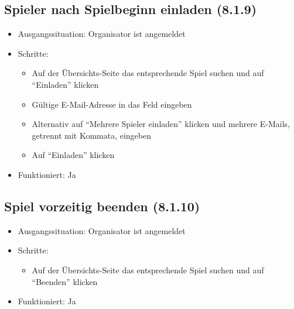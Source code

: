 \documentclass[a4paper]{scrreprt}
\begin{document}
            \subsection{Spieler nach Spielbeginn einladen (8.1.9)}
            \begin{itemize}
                \item Ausgangssituation: Organisator ist angemeldet
                \item Schritte:
                    \begin{itemize}
                        \item Auf der Übersichts-Seite das entsprechende Spiel suchen und auf \enquote{Einladen} klicken
                        \item Gültige E-Mail-Adresse in das Feld eingeben
                        \item Alternativ auf \enquote{Mehrere Spieler einladen} klicken und mehrere E-Mails, getrennt mit Kommata, eingeben
                        \item Auf \enquote{Einladen} klicken
                    \end{itemize}
                \item Funktioniert: Ja
            \end{itemize}

            \subsection{Spiel vorzeitig beenden (8.1.10)}
            \begin{itemize}
                \item Ausgangssituation: Organisator ist angemeldet
                \item Schritte:
                    \begin{itemize}
                        \item Auf der Übersichts-Seite das entsprechende Spiel suchen und auf \enquote{Beenden} klicken
                \end{itemize}
                \item Funktioniert: Ja
            \end{itemize}
\end{document}
